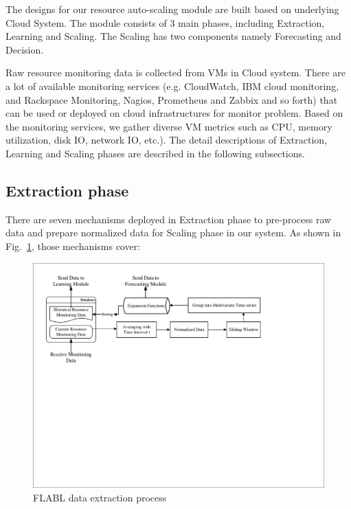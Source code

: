 \documentclass[runningheads]{llncs}
\begin{document}
\label{designing_system}

The designs for our resource auto-scaling module are built based on underlying Cloud System. The module consists of 3 main phases, including Extraction, Learning and Scaling. The Scaling has two components namely Forecasting and Decision.



Raw resource monitoring data is collected from VMs in Cloud system. There are a lot of available monitoring services (e.g. CloudWatch, IBM cloud monitoring, and Rackspace Monitoring, Nagios, Prometheus and Zabbix and so forth) that can be used or deployed on cloud infrastructures for monitor problem. Based on the monitoring services, we gather diverse VM metrics such as CPU, memory utilization, disk IO, network IO, etc.). The detail descriptions of Extraction, Learning and Scaling phases are described in the following subsections. 

\subsection{Extraction phase}
\label{extraction_phrase}

There are seven mechanisms deployed in Extraction phase to pre-process raw data and prepare normalized data for Scaling phase in our system. As shown in Fig.~\ref{FLABLextraction}, those mechanisms cover: 

\begin{figure}
	\begin{center}
		\includegraphics[width=0.9\textwidth =0cm 0cm 0cm 0cm, clip]{images/pdf/Extraction_Module.pdf}
		\caption{FLABL data extraction process}
		\label{FLABLextraction}
	\end{center}
\end{figure}
\end{document}
